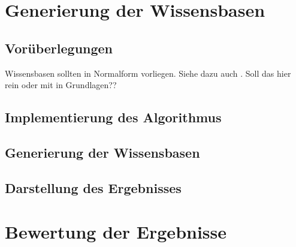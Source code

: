 \documentclass[12pt,a4paper]{article}
\begin{document}
\section{Generierung der Wissensbasen}
\subsection{Vorüberlegungen}
Wissensbasen sollten in Normalform vorliegen. Siehe dazu auch \cite{beierle17b}. Soll das hier rein oder mit in Grundlagen??
\subsection{Implementierung des Algorithmus}
\subsection{Generierung der Wissensbasen}
\subsection{Darstellung des Ergebnisses}
\section{Bewertung der Ergebnisse}

\newpage

 
\end{document}
